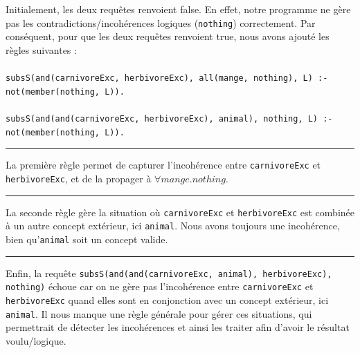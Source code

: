 \documentclass[a4paper,12pt]{report}
\begin{document}
\begin{tcolorbox}[colback=gray!10, colframe=blue!30, coltitle=black, title=Réponse à la question 4.3 - 1/1]

    Initialement, les deux requêtes renvoient false. En effet, notre programme ne gère pas les contradictions/incohérences logiques (\texttt{nothing}) correctement.
        Par conséquent, pour que les deux requêtes renvoient true, nous avons ajouté les règles suivantes :\\\\
    \texttt{subsS(and(carnivoreExc, herbivoreExc), all(mange, nothing), L) :- not(member(nothing, L)).}\\\\
    \texttt{subsS(and(and(carnivoreExc, herbivoreExc), animal), nothing, L) :- not(member(nothing, L)).}


    \vspace{0.5cm}
    \hrule
    \vspace{0.5cm}

    La première règle permet de capturer l'incohérence entre \texttt{carnivoreExc} et \texttt{herbivoreExc}, et de la propager à \(\forall mange.nothing\).

    \vspace{0.5cm}
    \hrule
    \vspace{0.5cm}

    La seconde règle gère la situation où \texttt{carnivoreExc} et \texttt{herbivoreExc} est combinée à un autre concept extérieur, ici \texttt{animal}. Nous
        avons toujours une incohérence, bien qu'\texttt{animal} soit un concept valide.

    \vspace{0.5cm}
    \hrule
    \vspace{0.5cm}

    Enfin, la requête \texttt{subsS(and(and(carnivoreExc, animal), herbivoreExc), nothing)} échoue car on ne gère pas l'incohérence entre \texttt{carnivoreExc} et 
        \texttt{herbivoreExc} quand elles sont en conjonction avec un concept extérieur, ici \texttt{animal}. Il nous manque une règle générale pour gérer ces situations,
        qui permettrait de détecter les incohérences et ainsi les traiter afin d'avoir le résultat voulu/logique.

\end{tcolorbox}



\end{document}
